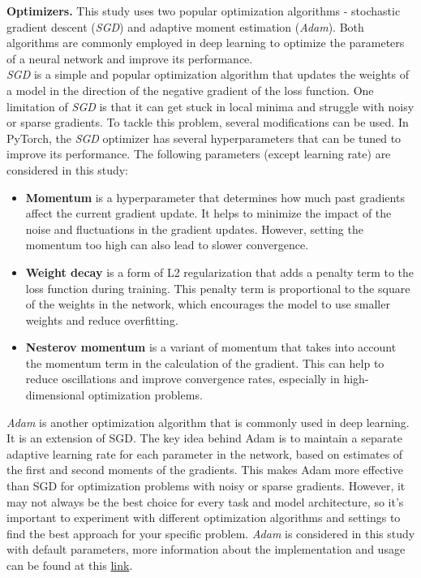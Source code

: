 \textbf{Optimizers.} This study uses two popular optimization algorithms - stochastic gradient descent (\textit{SGD}) and adaptive moment estimation (\textit{Adam}). Both algorithms are commonly employed in deep learning to optimize the parameters of a neural network and improve its performance. \\

\textit{SGD} is a simple and popular optimization algorithm that updates the weights of a model in the direction of the negative gradient of the loss function. One limitation of \textit{SGD} is that it can get stuck in local minima and struggle with noisy or sparse gradients. To tackle this problem, several modifications can be used. In PyTorch, the \textit{SGD} optimizer has several hyperparameters that can be tuned to improve its performance. The following parameters (except learning rate) are considered in this study: 

\begin{itemize}
    \item \textbf{Momentum} is a hyperparameter that determines how much past gradients affect the current gradient update. It helps to minimize the impact of the noise and fluctuations in the gradient updates. However, setting the momentum too high can also lead to slower convergence.
    
    \item  \textbf{Weight decay} is a form of L2 regularization that adds a penalty term to the loss function during training. This penalty term is proportional to the square of the weights in the network, which encourages the model to use smaller weights and reduce overfitting.

    \item \textbf{Nesterov momentum} is a variant of momentum that takes into account the momentum term in the calculation of the gradient. This can help to reduce oscillations and improve convergence rates, especially in high-dimensional optimization problems.
\end{itemize}

\textit{Adam} is another optimization algorithm that is commonly used in deep learning. It is an extension of SGD. The key idea behind Adam is to maintain a separate adaptive learning rate for each parameter in the network, based on estimates of the first and second moments of the gradients. This makes Adam more effective than SGD for optimization problems with noisy or sparse gradients. However, it may not always be the best choice for every task and model architecture, so it's important to experiment with different optimization algorithms and settings to find the best approach for your specific problem. \textit{Adam} is considered in this study with default parameters, more information about the implementation and usage can be found at this \href{https://pytorch.org/docs/stable/generated/torch.optim.Adam.html}{link}.\\

